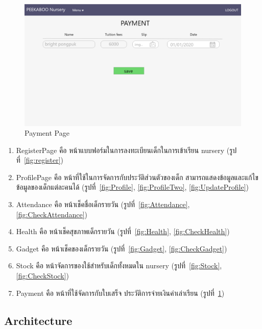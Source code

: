 \begin{figure}
  \begin{center}
  \includegraphics[width=\linewidth]{images/paymentPage.png}
  \end{center}
  \caption[Poem]{Payment Page}
  \label{fig:Payment}
  \end{figure}
\begin{enumerate}
  \item RegisterPage คือ หน้าแบบฟอร์มในการลงทะเบียนเด็กในการเข้าเรียน nursery (รูปที่~\ref{fig:register})
  \item  ProfilePage คือ หน้าที่ใช้ในการจัดการกับประวัติส่วนตัวของเด็ก สามารถแสดงข้อมูลและแก้ไขข้อมูลของเด็กแต่ละคนได้ (รูปที่~\ref{fig:Profile}, \ref{fig:ProfileTwo}, \ref{fig:UpdateProfile})
  \item  Attendance คือ หน้าเช็คชื่อเด็กรายวัน (รูปที่~\ref{fig:Attendance}, \ref{fig:CheckAttendance})
  \item  Health คือ หน้าเช็คสุขภาพเด็กรายวัน (รูปที่~\ref{fig:Health}, \ref{fig:CheckHealth}) 
  \item  Gadget คือ หน้าเช็คของเด็กรายวัน (รูปที่~\ref{fig:Gadget}, \ref{fig:CheckGadget}) 
  \item  Stock คือ หน้าจัดการของใช้สำหรับเด็กทั้งหมดใน nursery (รูปที่~\ref{fig:Stock}, \ref{fig:CheckStock}) 
  \item  Payment คือ หน้าที่ใช้จัดการกับใบเสร็จ ประวัติการจ่ายเงินค่าเล่าเรียน (รูปที่~\ref{fig:Payment}) 
\end{enumerate}








\subsection{Architecture}

